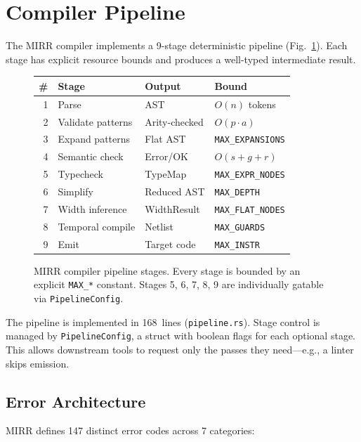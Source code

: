\documentclass[conference]{IEEEtran}
\begin{document}
\section{Compiler Pipeline}\label{sec:pipeline}

The MIRR compiler implements a 9-stage deterministic pipeline
(Fig.~\ref{fig:pipeline}).  Each stage has explicit resource bounds and
produces a well-typed intermediate result.

\begin{figure}[t]
\centering
\small
\begin{tabular}{@{}rlll@{}}
\toprule
\textbf{\#} & \textbf{Stage} & \textbf{Output} & \textbf{Bound} \\
\midrule
1 & Parse           & AST            & $O(n)$ tokens \\
2 & Validate patterns & Arity-checked  & $O(p \cdot a)$ \\
3 & Expand patterns & Flat AST       & \texttt{MAX\_EXPANSIONS} \\
4 & Semantic check  & Error/OK       & $O(s + g + r)$ \\
5 & Typecheck       & TypeMap        & \texttt{MAX\_EXPR\_NODES} \\
6 & Simplify        & Reduced AST    & \texttt{MAX\_DEPTH} \\
7 & Width inference  & WidthResult    & \texttt{MAX\_FLAT\_NODES} \\
8 & Temporal compile & Netlist        & \texttt{MAX\_GUARDS} \\
9 & Emit            & Target code    & \texttt{MAX\_INSTR} \\
\bottomrule
\end{tabular}
\caption{MIRR compiler pipeline stages.  Every stage is bounded by an
explicit \texttt{MAX\_*} constant.  Stages 5, 6, 7, 8, 9 are individually
gatable via \texttt{PipelineConfig}.}
\label{fig:pipeline}
\end{figure}

The pipeline is implemented in 168~lines (\texttt{pipeline.rs}).
Stage control is managed by \texttt{PipelineConfig}, a struct with
boolean flags for each optional stage.  This allows downstream tools to
request only the passes they need---e.g., a linter skips emission.

\subsection{Error Architecture}

MIRR defines 147 distinct error codes across 7 categories:
\end{document}
